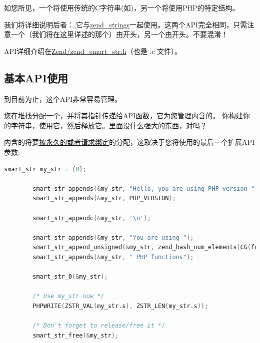 如您所见，一个将使用传统的C字符串(如)，另一个将使用PHP的特定结构。

我们将详细说明后者：,它与\href{http://www.phpinternalsbook.com/php7/internal_types/strings/zend_strings.html}{zend\_strings}一起使用。这两个API完全相同，只需注意一个（我们将在这里详述的那个）由开头，另一个由开头。不要混淆！

 API详细介绍在\href{https://github.com/php/php-src/blob/509f5097ab0b578adc311c720afcea8de266aadd/Zend/zend_smart_str.h}{Zend/zend\_smart\_str.h}（也是 .c 文件）。


\subsection{基本API使用}

到目前为止，这个API非常容易管理。

您在堆栈分配一个，并将其指针传递给API函数，它为您管理内含的。 你构建你的字符串，使用它，然后释放它。里面没什么强大的东西，对吗？

内含的将要\href{http://www.phpinternalsbook.com/php7/memory_management/zend_memory_manager.html}{被永久的或者请求绑定}的分配，这取决于您将使用的最后一个扩展API参数:

\begin{lstlisting}[language=c]
        smart_str my_str = {0};

        smart_str_appends(&my_str, "Hello, you are using PHP version ");
        smart_str_appends(&my_str, PHP_VERSION);

        smart_str_appendc(&my_str, '\n');

        smart_str_appends(&my_str, "You are using ");
        smart_str_append_unsigned(&my_str, zend_hash_num_elements(CG(function_table)));
        smart_str_appends(&my_str, " PHP functions");

        smart_str_0(&my_str);

        /* Use my_str now */
        PHPWRITE(ZSTR_VAL(my_str.s), ZSTR_LEN(my_str.s));

        /* Don't forget to release/free it */
        smart_str_free(&my_str);

\end{lstlisting}  



